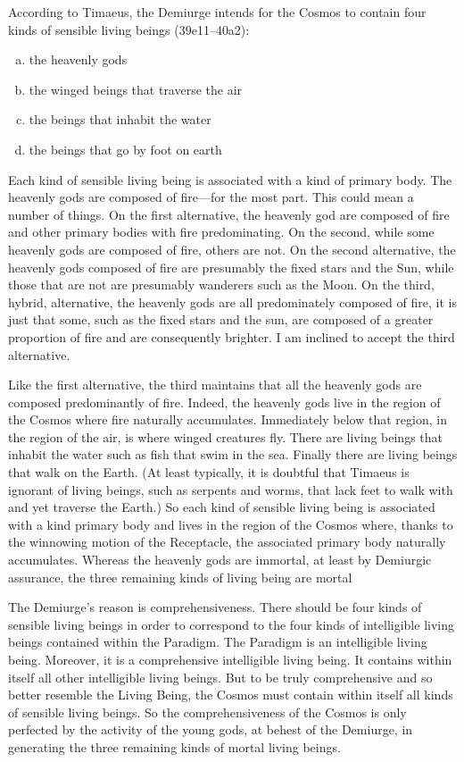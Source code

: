 According to Timaeus, the Demiurge intends for the Cosmos to contain four kinds of sensible living beings (39e11--40a2):
\begin{enumerate}[(a)]
	\item the heavenly gods
	\item the winged beings that traverse the air
	\item the beings that inhabit the water
	\item the beings that go by foot on earth
\end{enumerate}
Each kind of sensible living being is associated with a kind of primary body. The heavenly gods are composed of fire---for the most part. This could mean a number of things. On the first alternative, the heavenly god are composed of fire and other primary bodies with fire predominating. On the second, while some heavenly gods are composed of fire, others are not. On the second alternative, the heavenly gods composed of fire are presumably the fixed stars and the Sun, while those that are not are presumably wanderers such as the Moon. On the third, hybrid, alternative, the heavenly gods are all predominately composed of fire, it is just that some, such as the fixed stars and the sun, are composed of a greater proportion of fire and are consequently brighter. I am inclined to accept the third alternative. 

Like the first alternative, the third maintains that all the heavenly gods are composed predominantly of fire. Indeed, the heavenly gods live in the region of the Cosmos where fire naturally accumulates. Immediately below that region, in the region of the air, is where winged creatures fly. There are living beings that inhabit the water such as fish that swim in the sea. Finally there are living beings that walk on the Earth. (At least typically, it is doubtful that Timaeus is ignorant of living beings, such as serpents and worms, that lack feet to walk with and yet traverse the Earth.) So each kind of sensible living being is associated with a kind primary body and lives in the region of the Cosmos where, thanks to the winnowing motion of the Receptacle, the associated primary body naturally accumulates. Whereas the heavenly gods are immortal, at least by Demiurgic assurance, the three remaining kinds of living being are mortal

The Demiurge's reason is comprehensiveness. There should be four kinds of sensible living beings in order to correspond to the four kinds of intelligible living beings contained within the Paradigm. The Paradigm is an intelligible living being. Moreover, it is a comprehensive intelligible living being. It contains within itself all other intelligible living beings. But to be truly comprehensive and so better resemble the Living Being, the Cosmos must contain within itself all kinds of sensible living beings. So the comprehensiveness of the Cosmos is only perfected by the activity of the young gods, at behest of the Demiurge, in generating the three remaining kinds of mortal living beings.

